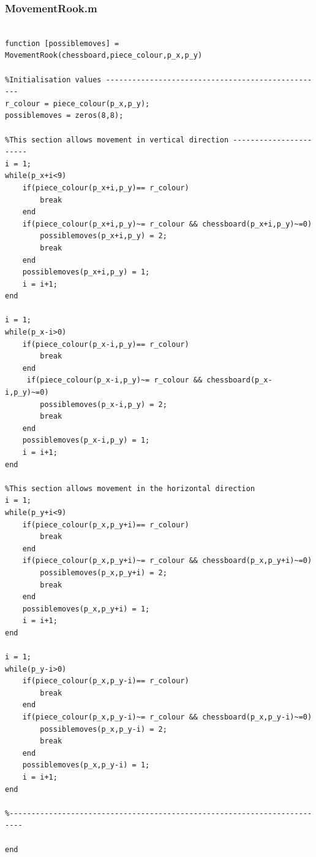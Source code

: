 \documentclass[11pt,a4paper]{article}
\begin{document}
\subsubsection{MovementRook.m}
\begin{lstlisting}

function [possiblemoves] = MovementRook(chessboard,piece_colour,p_x,p_y)

%Initialisation values --------------------------------------------------
r_colour = piece_colour(p_x,p_y);
possiblemoves = zeros(8,8);

%This section allows movement in vertical direction -----------------------
i = 1;
while(p_x+i<9)
    if(piece_colour(p_x+i,p_y)== r_colour)
        break
    end
    if(piece_colour(p_x+i,p_y)~= r_colour && chessboard(p_x+i,p_y)~=0)
        possiblemoves(p_x+i,p_y) = 2;
        break
    end
    possiblemoves(p_x+i,p_y) = 1;
    i = i+1;
end
            
i = 1;
while(p_x-i>0)
    if(piece_colour(p_x-i,p_y)== r_colour)
        break
    end
     if(piece_colour(p_x-i,p_y)~= r_colour && chessboard(p_x-i,p_y)~=0)
        possiblemoves(p_x-i,p_y) = 2;
        break
    end
    possiblemoves(p_x-i,p_y) = 1;
    i = i+1;
end

%This section allows movement in the horizontal direction
i = 1;
while(p_y+i<9)
    if(piece_colour(p_x,p_y+i)== r_colour)
        break
    end
    if(piece_colour(p_x,p_y+i)~= r_colour && chessboard(p_x,p_y+i)~=0)
        possiblemoves(p_x,p_y+i) = 2;
        break
    end
    possiblemoves(p_x,p_y+i) = 1;
    i = i+1;
end

i = 1;
while(p_y-i>0)
    if(piece_colour(p_x,p_y-i)== r_colour)
        break
    end
    if(piece_colour(p_x,p_y-i)~= r_colour && chessboard(p_x,p_y-i)~=0)
        possiblemoves(p_x,p_y-i) = 2;
        break
    end
    possiblemoves(p_x,p_y-i) = 1;
    i = i+1;
end

%-------------------------------------------------------------------------

end
\end{lstlisting}
\end{document}
